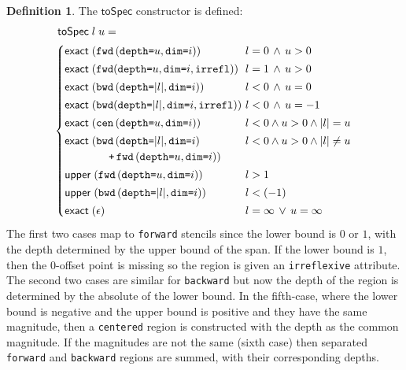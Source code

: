 \documentclass[9pt]{sigplanconf}
\newcounter{block}
\theoremstyle{definition}
\newtheorem{definition}[block]{Definition}
\newcommand{\term}[1]{\texttt{#1}}
\newcommand{\stenFwdS}[2]{\term{fwd} \, (\term{depth=}#1,
  \term{dim=}#2)}
\newcommand{\stenBwdS}[2]{\term{bwd} \, (\term{depth=}#1,
  \term{dim=}#2)}
\newcommand{\stenCenS}[2]{\term{cen} \, (\term{depth=}#1,
  \term{dim=}#2)}
\newcommand{\irreflS}{\texttt{irrefl}}
\newcommand{\stenFwdSR}[3]{\term{fwd} (\term{depth=}#1,
  \term{dim=}#2, #3)}
\newcommand{\stenBwdSR}[3]{\term{bwd} (\term{depth=}#1,
  \term{dim=}#2, #3)}
\newcommand{\vect}[1]{\textbf{#1}}
\begin{document}
\begin{definition} The $\mathsf{toSpec}$ constructor is defined:
\newcommand{\llower}{l}
\newcommand{\lupper}{u}
\begin{align*}
&\mathsf{toSpec} \; \llower \; \lupper = \\
&\hspace{-0.4em}\begin{cases}
\exact{\stenFwdS{\lupper}{i}}  & \llower = 0 \, \wedge \, \lupper > 0 \\[0.2em]
\exact{\stenFwdSR{\lupper}{i}{\irreflS}}\!\!\!\! & \llower = 1 \, \wedge \, \lupper > 0 \\[0.2em]
\exact{\stenBwdS{|\llower|}{i}}  & \llower < 0 \, \wedge \, \lupper = 0 \\[0.2em]
\exact{\stenBwdSR{|\llower|}{i}{\irreflS}}\!\!\!\! & \llower < 0 \, \wedge \, \lupper = -1 \\[0.2em]
\exact{\stenCenS{\lupper}{i}}& \llower < 0 \wedge \lupper > 0 \wedge |\llower| = \lupper \\[0.2em]
\exactR(\stenBwdS{|\llower|}{i} & \llower < 0 \wedge \lupper > 0  \wedge |\llower| \neq \lupper \\
\qquad\qquad \texttt{+} \, \stenFwdS{\lupper}{i}) & \\[0.2em]
\upperB{\stenFwdS{\lupper}{i}} & \llower > 1 \\[0.2em]
\upperB{\stenBwdS{|\llower|}{i}} \quad & \llower < (-1)
 \\[0.2em]
\exact{\epsilon} & \llower = \infty \, \vee \, \lupper = \infty
  \end{cases}
\end{align*}
The first two cases map to \texttt{forward} stencils since the lower
bound is $0$ or $1$, with the depth determined by the upper bound of
the span. If the lower bound is $1$, then the
$0$-offset point is missing so the region is given an
\texttt{irreflexive} attribute. The second two cases are similar for
\texttt{backward} but now the depth of the region is determined by the
absolute of the lower bound. In the fifth-case, where the lower bound
is negative and the upper bound is positive and they have the same
magnitude, then a \texttt{centered} region is constructed with
the depth as the common magnitude. If the magnitudes are not the same
(sixth case) then separated \texttt{forward} and \texttt{backward}
regions are summed, with their corresponding depths.


\end{definition}
\end{document}

